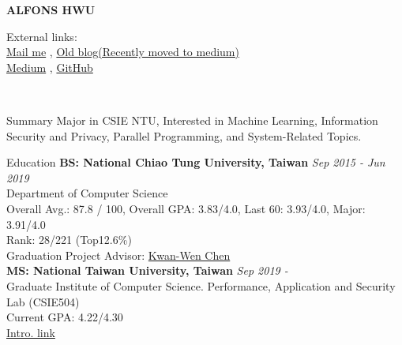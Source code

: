 \documentclass{resume} %
\begin{document}
\begin{center}
    {\huge\textbf{ALFONS HWU}}
\end{center}
External links: 
\\ \href{mailto: alfons.cs04@g2.nctu.edu.tw}{Mail me}
, \href{https://alfons0329.github.io/afhwu0329.github.io/}{Old blog(Recently moved to medium)}
\\ \href{https://medium.com/@alfons0329}{Medium}
, \href{https://github.com/Alfons0329}{GitHub}

\\
\begin{rSection}{Summary}
Major in CSIE NTU, Interested in Machine Learning, Information Security and Privacy, Parallel Programming, and System-Related Topics.
\end{rSection}


\begin{rSection}{Education}
{\bf BS: National Chiao Tung University, Taiwan} \hfill {\em Sep 2015 - Jun 2019} 
\\ Department of Computer Science  
\\ Overall Avg.: 87.8 / 100, Overall GPA: 3.83/4.0, Last 60: 3.93/4.0, Major: 3.91/4.0
\\ Rank: 28/221 (Top12.6\%)
\\ Graduation Project Advisor: \href{https://www.cs.nctu.edu.tw/members/detail/kuanwen}{Kwan-Wen Chen} 
\\
{\bf MS: National Taiwan University, Taiwan} \hfill {\em Sep 2019 - }
\\ Graduate Institute of Computer Science. Performance, Application and Security Lab (CSIE504)
\\ Current GPA: 4.22/4.30
\\
\href{https://hungsh-ntucsie.blogspot.com/p/blog-page_2668.html}{Intro. link}
\end{rSection}

\end{document}
